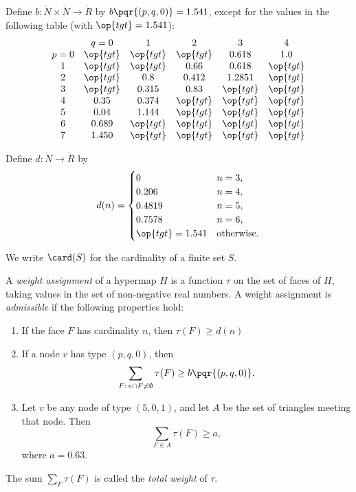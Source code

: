 \begin{definition}[b]
  Define $b:\ring{N}\times \ring{N}\to \ring{R}$ by $b\pqr{(p,q,0)}=1.541$,
  except for the values in the following table
  (with  $\op{tgt}=1.541$):
  {
  \def\tx{\op{tgt}}
  $$\begin{matrix}  &q=0&1&2&3&4\\
           p=0&\tx&\tx&\tx&0.618&1.0\\
           1&\tx&\tx&0.66&0.618&\tx\\
           2&\tx&0.8&0.412&1.2851&\tx\\
           3&\tx&0.315&0.83&\tx&\tx\\
           4&0.35&0.374&\tx&\tx&\tx\\
           5&0.04&1.144&\tx&\tx&\tx\\
           6&0.689&\tx&\tx&\tx&\tx\\
           7&1.450&\tx&\tx&\tx&\tx
   \end{matrix}
   $$
   }
\end{definition}


\begin{definition}[d]
    Define $d:\ring{N}\to \ring{R}$ by
  $$d(n) = \begin{cases}
    0 & n=3, \\
    0.206 & n=4, \\
    0.4819 & n=5, \\
    0.7578 & n=6, \\
    \op{tgt}=1.541 & \text{otherwise}.
  \end{cases}
  $$
\end{definition}


We write $\card(S)$ for the cardinality of a finite set $S$.


\begin{definition}
%
A {\it weight assignment\/} of a hypermap $H$ is a function $\tau$ on
the set of faces of $H$, taking values in the set of non-negative
real numbers. A weight assignment is {\it admissible} if the
following properties hold:
%
\begin{enumerate}
  \item If the face $F$ has cardinality $n$, then
        $\tau(F) \ge d(n)$
  \item If a node $v$ has type $(p,q,0)$, then
        $$\sum_{F:\,v\cap F\ne\emptyset} \tau(F) \ge b{\pqr{(p,q,0)}}.$$
        \label{admissible:b}
  \item Let $v$ be any node of type $(5,0,1)$, and let $A$ be the set of
triangles meeting that node.
        Then
        $$\sum_{F\in A} \tau(F)
            \ge  a,$$
   where $a=0.63$.
        \label{definition:admissible:excess}
\end{enumerate}
The sum $\sum_F \tau(F)$ is called the {\it total weight} of $\tau$.
\end{definition}

